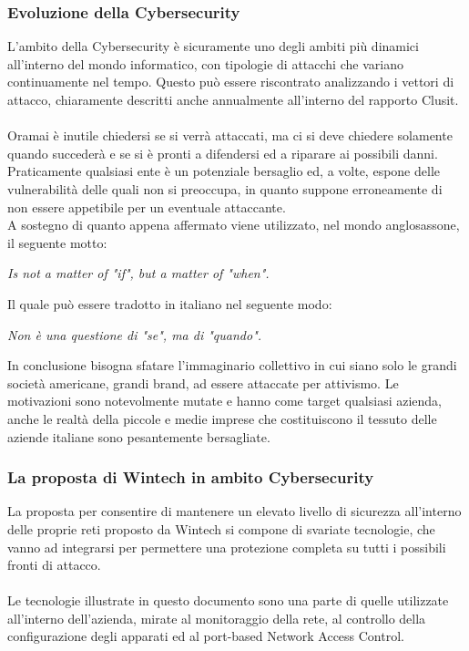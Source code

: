 \documentclass[Tesi.tex]{subfiles}
\begin{document}
\subsubsection{Evoluzione della Cybersecurity}
L'ambito della Cybersecurity è sicuramente uno degli ambiti più dinamici all'interno del mondo informatico, con tipologie di attacchi che variano continuamente nel tempo. Questo può essere riscontrato analizzando i vettori di attacco, chiaramente descritti anche annualmente all'interno del rapporto Clusit. \\\\
Oramai è inutile chiedersi se si verrà attaccati, ma ci si deve chiedere solamente quando succederà e se si è pronti a difendersi ed a riparare ai possibili danni. 
Praticamente qualsiasi ente è un potenziale bersaglio ed, a volte, espone delle vulnerabilità delle quali non si preoccupa, in quanto suppone erroneamente di non essere appetibile per un eventuale attaccante. \\
A sostegno di quanto appena affermato viene utilizzato, nel mondo anglosassone, il seguente motto:
\begin{center} \textsl{Is not a matter of "if", but a matter of "when".} \end{center}
Il quale può essere tradotto in italiano nel seguente modo:
\begin{center} \textsl{Non è una questione di "se", ma di "quando".} \end{center}
In conclusione bisogna sfatare l'immaginario collettivo in cui siano solo le grandi società americane, grandi brand, ad essere attaccate per attivismo. Le motivazioni sono notevolmente mutate e hanno come target qualsiasi azienda, anche le realtà della piccole e medie imprese che costituiscono il tessuto delle aziende italiane sono pesantemente bersagliate.

\subsubsection{La proposta di Wintech in ambito Cybersecurity}
La proposta per consentire di mantenere un elevato livello di sicurezza all'interno delle proprie reti proposto da Wintech si compone di svariate tecnologie, che vanno ad integrarsi per permettere una protezione completa su tutti i possibili fronti di attacco. \\\\
Le tecnologie illustrate in questo documento sono una parte di quelle utilizzate all'interno dell'azienda, mirate al monitoraggio della rete, al controllo della configurazione degli apparati ed al port-based Network Access Control.
\end{document}
